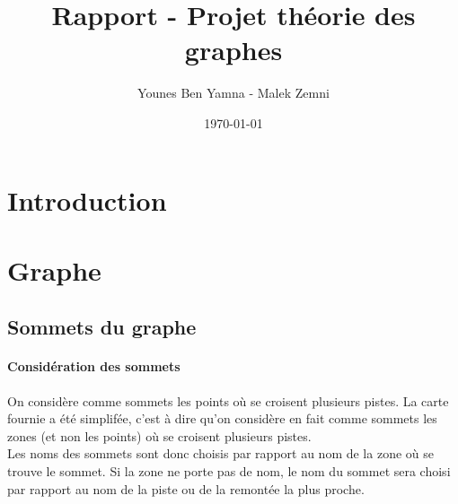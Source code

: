 \documentclass[a4]{article}
\author{Younes Ben Yamna - Malek Zemni}
\title{Rapport - Projet théorie des graphes}
\date{\today}
\begin{document}
\lstset{language=C}
\maketitle

	\section{Introduction}
	\section{Graphe}
		\subsection{Sommets du graphe}
			\paragraph{Considération des sommets\\}
			On considère comme sommets les points où se croisent plusieurs pistes. La carte fournie a été simplifée, c'est à dire qu'on
			considère en fait comme sommets les zones (et non les points) où se croisent plusieurs pistes.\\
			Les noms des sommets sont donc choisis par rapport au nom de la zone où se trouve le sommet. 
			Si la zone ne porte pas de nom, le nom du sommet sera choisi par rapport au nom de la piste ou de la remontée la plus proche.
\end{document}
